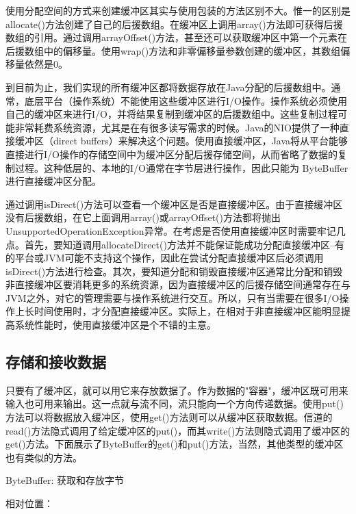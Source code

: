		使用分配空间的方式来创建缓冲区其实与使用包装的方法区别不大。惟一的区别是allocate()方法创建了自己的后援数组。在缓冲区上调用array()方法即可获得后援数组的引用。通过调用arrayOffset()方法，甚至还可以获取缓冲区中第一个元素在后援数组中的偏移量。使用wrap()方法和非零偏移量参数创建的缓冲区，其数组偏移量依然是0。 

		到目前为止，我们实现的所有缓冲区都将数据存放在Java分配的后援数组中。通常，底层平台（操作系统）不能使用这些缓冲区进行I/O操作。操作系统必须使用自己的缓冲区来进行I/O，并将结果复制到缓冲区的后援数组中。这些复制过程可能非常耗费系统资源，尤其是在有很多读写需求的时候。Java的NIO提供了一种直接缓冲区（direct buffers）来解决这个问题。使用直接缓冲区，Java将从平台能够直接进行I/O操作的存储空间中为缓冲区分配后援存储空间，从而省略了数据的复制过程。这种低层的、本地的I/O通常在字节层进行操作，因此只能为 ByteBuffer进行直接缓冲区分配。 

		

		通过调用isDirect()方法可以查看一个缓冲区是否是直接缓冲区。由于直接缓冲区没有后援数组，在它上面调用array()或arrayOffset()方法都将抛出UnsupportedOperationException异常。在考虑是否使用直接缓冲区时需要牢记几点。首先，要知道调用allocateDirect()方法并不能保证能成功分配直接缓冲区--有的平台或JVM可能不支持这个操作，因此在尝试分配直接缓冲区后必须调用isDirect()方法进行检查。其次，要知道分配和销毁直接缓冲区通常比分配和销毁非直接缓冲区要消耗更多的系统资源，因为直接缓冲区的后援存储空间通常存在与JVM之外，对它的管理需要与操作系统进行交互。所以，只有当需要在很多I/O操作上长时间使用时，才分配直接缓冲区。实际上，在相对于非直接缓冲区能明显提高系统性能时，使用直接缓冲区是个不错的主意。 

	\subsection{存储和接收数据}

		只要有了缓冲区，就可以用它来存放数据了。作为数据的"容器"，缓冲区既可用来输入也可用来输出。这一点就与流不同，流只能向一个方向传递数据。使用put()方法可以将数据放入缓冲区，使用get()方法则可以从缓冲区获取数据。信道的read()方法隐式调用了给定缓冲区的put()，而其write()方法则隐式调用了缓冲区的get()方法。下面展示了ByteBuffer的get()和put()方法，当然，其他类型的缓冲区也有类似的方法。 

		ByteBuffer: 获取和存放字节 

		相对位置： 

		

